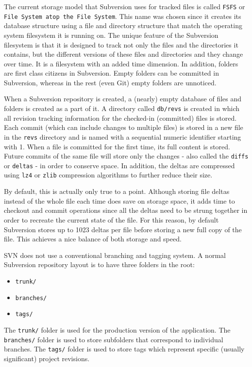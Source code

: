 The current storage model that Subversion uses for tracked files is called \lstinline{FSFS} or \lstinline{File System atop the File System}. This name was chosen since it creates its database structure using a file and directory structure that match the operating system filesystem it is running on. The unique feature of the Subversion filesystem is that it is designed to track not only the files and the directories it contains, but the different versions of these files and directories and they change over time. It is a filesystem with an added time dimension. In addition, folders are first class citizens in Subversion. Empty folders can be committed in Subversion, whereas in the rest (even Git) empty folders are unnoticed.

When a Subversion repository is created, a (nearly) empty database of files and folders is created as a part of it. A directory called \lstinline{db/revs} is created in which all revision tracking information for the checked-in (committed) files is stored. Each commit (which can include changes to multiple files) is stored in a new file in the \lstinline{revs} directory and is named with a sequential numeric identifier starting with 1. When a file is committed for the first time, its full content is stored. Future commits of the same file will store only the changes - also called the \lstinline{diffs} or \lstinline{deltas} - in order to conserve space. In addition, the deltas are compressed using \lstinline{lz4} or \lstinline{zlib} compression algorithms to further reduce their size.

By default, this is actually only true to a point. Although storing file deltas instead of the whole file each time does save on storage space, it adds time to checkout and commit operations since all the deltas need to be strung together in order to recreate the current state of the file. For this reason, by default Subversion stores up to 1023 deltas per file before storing a new full copy of the file. This achieves a nice balance of both storage and speed.

SVN does not use a conventional branching and tagging system. A normal Subversion repository layout is to have three folders in the root:
\begin{itemize}
    \item \lstinline{trunk/}
    \item \lstinline{branches/}
    \item \lstinline{tags/}
\end{itemize}
The \lstinline{trunk/} folder is used for the production version of the application.
The \lstinline{branches/} folder is used to store subfolders that correspond to individual branches.
The \lstinline{tags/} folder is used to store tags which represent specific (usually significant) project revisions.

